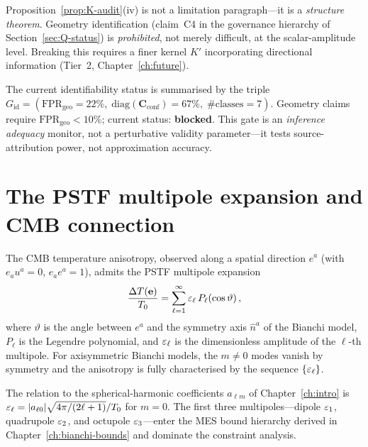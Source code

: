 \begin{remark}
\label{rem:geom-prohibition}
Proposition~\ref{prop:K-audit}(iv) is not a limitation
paragraph---it is a \emph{structure theorem}.  Geometry
identification (claim~C4 in the governance hierarchy of
Section~\ref{sec:Q-status}) is \emph{prohibited}, not merely
difficult, at the scalar-amplitude level.  Breaking this
requires a finer kernel $K'$ incorporating directional
information (Tier~2, Chapter~\ref{ch:future}).
\end{remark}

\begin{remark}
\label{rem:G-id}
The current identifiability status is summarised by the triple
$G_{\mathrm{id}} =
(\mathrm{FPR}_{\mathrm{geo}} = 22\%,\;
\mathrm{diag}(\mathbf{C}_{\mathrm{conf}}) = 67\%,\;
\#\text{classes} = 7)$.
Geometry claims require
$\mathrm{FPR}_{\mathrm{geo}} < 10\%$; current status:
\textbf{blocked}.  This gate is an \emph{inference adequacy}
monitor, not a perturbative validity parameter---it tests
source-attribution power, not approximation accuracy.
\end{remark}


\section{The PSTF multipole expansion and CMB connection}
\label{sec:pstf-cmb}

The CMB temperature anisotropy, observed along a spatial
direction $e^a$ (with $e_a u^a = 0$, $e_a e^a = 1$), admits
the PSTF multipole expansion
\begin{equation}\label{eq:CMB-multipole}
\frac{\Delta T(\mathbf{e})}{T_0}
= \sum_{\ell=1}^{\infty}
  \varepsilon_\ell\,P_\ell(\cos\vartheta)\,,
\end{equation}
where $\vartheta$ is the angle between $e^a$ and the symmetry
axis $\hat{n}^a$ of the Bianchi model, $P_\ell$ is the Legendre
polynomial, and $\varepsilon_\ell$ is the dimensionless amplitude of
the $\ell$-th multipole.  For axisymmetric Bianchi models, the
$m \neq 0$ modes vanish by symmetry and the anisotropy is fully
characterised by the sequence $\{\varepsilon_\ell\}$.

The relation to the spherical-harmonic coefficients
$a_{\ell m}$ of Chapter~\ref{ch:intro} is
$\varepsilon_\ell = |a_{\ell 0}| \sqrt{4\pi/(2\ell+1)}/T_0$
for $m = 0$.  The first three multipoles---dipole $\varepsilon_1$,
quadrupole $\varepsilon_2$, and octupole $\varepsilon_3$---enter the MES
bound hierarchy derived in
Chapter~\ref{ch:bianchi-bounds} and dominate the constraint
analysis.


